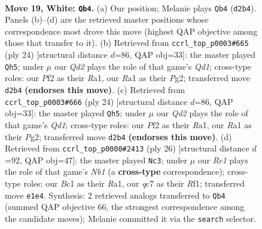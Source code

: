 \documentclass[11pt]{article}
\begin{document}
\clearpage

\begin{figure}[p]\centering
\begin{subfigure}{0.46\textwidth}\centering
\resizebox{\linewidth}{!}{%
\newchessgame
\chessboard[
  setfen={rnb1k2r/2q1b3/p2p4/3PppN1/2B3p1/8/PPPQ1PP1/R1B1RK2 w kq - 1 19},
  showmover=false,
  pgfstyle=straightmove, color=movearrow, markmove={d2-b4}
]}
\caption{}
\end{subfigure}\hfill
\begin{subfigure}{0.46\textwidth}\centering
\resizebox{\linewidth}{!}{%
\newchessgame
\chessboard[
  setfen={r1b1k2r/1pq1nppp/p2bp3/8/3N4/1B6/PPP2PPP/R1BQR1K1 w kq - 5 13},
  showmover=false,
  pgfstyle=straightmove, color=movearrow, markmove={d1-h5}
]}
\caption{}
\end{subfigure}
\\[4pt]
\begin{subfigure}{0.46\textwidth}\centering
\resizebox{\linewidth}{!}{%
\newchessgame
\chessboard[
  setfen={r1b1k2r/1pq1nppp/p2bp3/8/3N4/1B6/PPP2PPP/R1BQR1K1 w kq - 5 13},
  showmover=false,
  pgfstyle=straightmove, color=movearrow, markmove={d1-h5}
]}
\caption{}
\end{subfigure}\hfill
\begin{subfigure}{0.46\textwidth}\centering
\resizebox{\linewidth}{!}{%
\newchessgame
\chessboard[
  setfen={r1b1k2r/1pq3bp/p2p1np1/4n3/2PNP3/3B4/PP2Q1PP/RNB2R1K w kq - 2 14},
  showmover=false,
  pgfstyle=straightmove, color=movearrow, markmove={b1-c3}
]}
\caption{}
\end{subfigure}
\caption{\textbf{Move 19, White: \texttt{Qb4}.} (a) Our position; Melanie plays \texttt{Qb4} (\texttt{d2b4}). Panels (b)--(d) are the retrieved master positions whose correspondence most drove this move (highest QAP objective among those that transfer to it). (b) Retrieved from \texttt{ccrl\_top\_p0003\#665} (ply 24) [structural distance $d$=86, QAP obj=33]: the master played \texttt{Qh5}; under $\mu$ our \emph{Qd2} plays the role of that game's \emph{Qd1}; cross-type roles: our \emph{P}f2 as their \emph{R}a1, our \emph{R}a1 as their \emph{P}g2; transferred move \texttt{d2b4} \textbf{(endorses this move)}. (c) Retrieved from \texttt{ccrl\_top\_p0003\#666} (ply 24) [structural distance $d$=86, QAP obj=33]: the master played \texttt{Qh5}; under $\mu$ our \emph{Qd2} plays the role of that game's \emph{Qd1}; cross-type roles: our \emph{P}f2 as their \emph{R}a1, our \emph{R}a1 as their \emph{P}g2; transferred move \texttt{d2b4} \textbf{(endorses this move)}. (d) Retrieved from \texttt{ccrl\_top\_p0000\#2413} (ply 26) [structural distance $d$=92, QAP obj=47]: the master played \texttt{Nc3}; under $\mu$ our \emph{Re1} plays the role of that game's \emph{Nb1} (a \textbf{cross-type} correspondence); cross-type roles: our \emph{B}c1 as their \emph{R}a1, our \emph{q}c7 as their \emph{R}f1; transferred move \texttt{e1e4}. Synthesis: 2 retrieved analogs transferred to \texttt{Qb4} (summed QAP objective 66, the strongest correspondence among the candidate moves); Melanie committed it via the \texttt{search} selector.}
\label{fig:thought-m36}
\end{figure}
\end{document}
